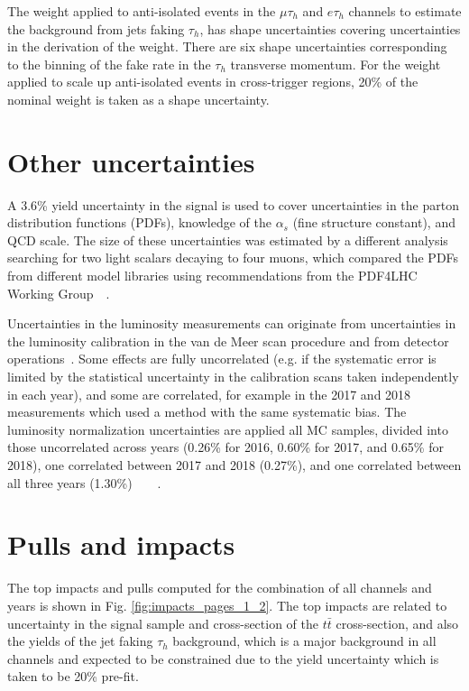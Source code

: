 The weight applied to anti-isolated events in the $\mu\tau_{h}$ and $e\tau_{h}$ channels to estimate the background from jets faking $\tau_{h}$, has shape uncertainties covering uncertainties in the derivation of the weight. There are six shape uncertainties corresponding to the binning of the fake rate in the $\tau_{h}$ transverse momentum. For the weight applied to scale up anti-isolated events in cross-trigger regions, 20\% of the nominal weight is taken as a shape uncertainty.

\section{Other uncertainties}
\label{section:uncertainties_others}
A 3.6\% yield uncertainty in the signal is used to cover uncertainties in the parton distribution functions (PDFs), knowledge of the $\alpha_s$ (fine structure constant), and QCD scale. The size of these uncertainties was estimated by a different analysis searching for two light scalars decaying to four muons, which compared the PDFs from different model libraries using recommendations from the PDF4LHC Working Group~\cite{CMS-PAS-HIG-13-010}~\cite{Botje:2011sn}.

Uncertainties in the luminosity measurements can originate from uncertainties in the luminosity calibration in the van de Meer scan procedure and from detector operations~\cite{CMS-LUM-18-002}. Some effects are fully uncorrelated (e.g. if the systematic error is limited by the statistical uncertainty in the calibration scans taken independently in each year), and some are correlated, for example in the 2017 and 2018 measurements which used a method with the same systematic bias. The luminosity normalization uncertainties are applied all MC samples, divided into those uncorrelated across years (0.26\% for 2016, 0.60\% for 2017, and 0.65\% for 2018), one correlated between 2017 and 2018 (0.27\%), and one correlated between all three years (1.30\%)~\cite{CMS-LUM-17-001}~\cite{CMS-LUM-17-004}~\cite{CMS-LUM-18-002}~\cite{twiki_LUMI_POG_recommendation}. 

\section{Pulls and impacts}
\label{section:pulls_and_impacts}
The top impacts and pulls computed for the combination of all channels and years is shown in Fig. \ref{fig:impacts_pages_1_2}. The top impacts are related to uncertainty in the signal sample and cross-section of the $t\bar{t}$ cross-section, and also the yields of the jet faking $\tau_{h}$ background, which is a major background in all channels and expected to be constrained due to the yield uncertainty which is taken to be 20\% pre-fit. 

